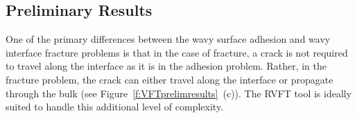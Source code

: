 \documentclass[10pt,letterpaper]{article}
\begin{document}


  \subsection{Preliminary Results}
    \label{s:curr}
    One of the primary differences between the wavy surface adhesion and wavy interface fracture problems is that in the case of fracture, a crack is not required to travel along the interface as it is in the adhesion problem.
   Rather, in the fracture problem, the crack can either travel along the interface or propagate through the bulk (see Figure~\ref{f:VFTprelimresults}~(c)). The RVFT tool is ideally suited to handle this additional level of complexity.
\end{document}
